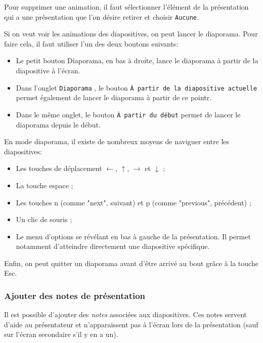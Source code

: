 Pour supprimer une animation, il faut sélectionner l'élément de la présentation qui a une présentation que l'on désire retirer et choisir \texttt{Aucune}.


Si on veut voir les animations des diapositives, on peut lancer le diaporama. Pour faire cela, il faut utiliser l'un des deux boutons suivants:
\begin{itemize}
	\item Le petit bouton Diaporama, en bas à droite, lance le diaporama à partir de la diapositive à l'écran. 
	\item Dans l'onglet \texttt{Diaporama} , le bouton \texttt{À partir de la diapositive actuelle} permet également de lancer le diaporama à partir de ce pointr. 
	\item Dans le même onglet, le bouton \texttt{À partir du début} permet de lancer le diaporama depuis le début. 
\end{itemize}


En mode diaporama, il existe de nombreux moyens de naviguer entre les diapositives:
\begin{itemize}
	\item Les touches de déplacement $\leftarrow$, $\uparrow$, $\rightarrow$ et $\downarrow$ ;
	\item La touche espace ;
	\item Les touches n (comme "next", suivant) et p (comme "previous", précédent) ;
	\item Un clic de souris ;
	\item Le menu d'options se révélant en bas à gauche de la présentation. Il permet notamment d'atteindre directement une diapositive spécifique.	
\end{itemize}

Enfin, on peut quitter un diaporama avant d'être arrivé au bout grâce à la touche Esc.


\subsubsection{Ajouter des notes de présentation}\label{Presentation1notes}


Il est possible d'ajouter des \emph{\og notes \fg} associées aux diapositives. Ces notes servent d'aide au présentateur et n'apparaissent pas à l'écran lors de la présentation (sauf sur l'écran secondaire s'il y en a un).

